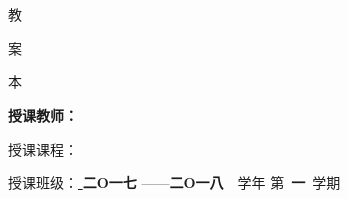 \documentclass[UTF8,zihao = -4]{ctexart}
\begin{document}
\begin{titlepage}
	
\begin{center}
{  \bf
{}  \\
 \\ }
\vfill 
{  \fangsong  \fontsize{46pt}{80pt}\selectfont
   教\par 案\par 本\par }
\par
\vfill \vfill {} \setlength{\baselineskip}{1cm}  \bf  
 授课教师：\underline{ \makebox[5cm]{ \jsxmNR}}\par
 授课课程：\underline{ }\par
授课班级：\underline{ \makebox[5cm]{ \skbcNR}} 
\vfill
{\bf 二O一七 }——{\bf 二O一八}~~学年\hspace{0.5cm} 第~{\bf 一}~学期
\end{center}
\vfill

\end{titlepage}

%

\tableofcontents

\thispagestyle{empty}



\setcounter{page}{1}




































%
\end{document}
